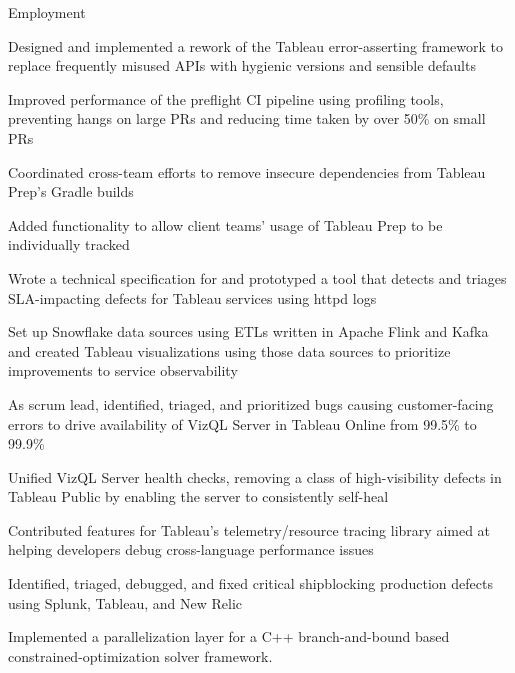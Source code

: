 \documentclass{cv}
\begin{document}

\begin{cvsection}{Employment}
  {
    \item Designed and implemented a rework of the Tableau error-asserting framework to replace frequently misused APIs with hygienic versions and sensible defaults
    \item Improved performance of the preflight CI pipeline using profiling tools, preventing hangs on large PRs and reducing time taken by over 50\% on small PRs
    \item Coordinated cross-team efforts to remove insecure dependencies from Tableau Prep's Gradle builds
    \item Added functionality to allow client teams' usage of Tableau Prep to be individually tracked
    \item Wrote a technical specification for and prototyped a tool that detects and triages SLA-impacting defects for Tableau services using httpd logs
    \item Set up Snowflake data sources using ETLs written in Apache Flink and Kafka and created Tableau visualizations using those data sources to prioritize improvements to service observability
    \item As scrum lead, identified, triaged, and prioritized bugs causing customer-facing errors to drive availability of VizQL Server in Tableau Online from 99.5\% to 99.9\%
    \item Unified VizQL Server health checks, removing a class of high-visibility defects in Tableau Public by enabling the server to consistently self-heal
    \item Contributed features for Tableau's telemetry/resource tracing library aimed at helping developers debug cross-language performance issues
    \item Identified, triaged, debugged, and fixed critical shipblocking production defects using Splunk, Tableau, and New Relic
  }
  {
    \item Implemented a parallelization layer for a C++ branch-and-bound based constrained-optimization solver framework.
}
\end{cvsection}
\end{document}

